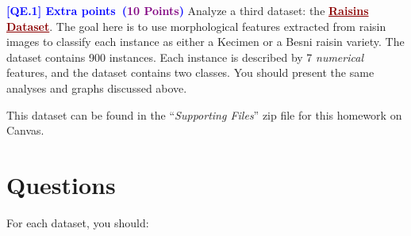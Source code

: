 \documentclass{article}
\newcommand{\HIGHLIGHT}[1]{\textcolor{blue}{\textbf{#1}}}
\newcommand{\POINTS}[1]{\textcolor{purple}{\textbf{{#1}}}}
\begin{document}
    \noindent \textbf{\HIGHLIGHT{[QE.1] Extra points~(\POINTS{10 Points})}} Analyze a third dataset: the \textcolor{darkred}{\textbf{\ul{Raisins Dataset}}}. The goal here is to use morphological features extracted from raisin images to classify each instance as either a Kecimen or a Besni raisin variety. The dataset contains 900 instances. Each instance is described by 7 \textit{numerical} features, and the dataset contains two classes. You should present the same analyses and graphs discussed above.
    \begin{mybox}[boxgray] 
    This dataset can be found in the ``\textit{Supporting Files}'' zip file for this homework on Canvas.
    \end{mybox}


\section*{Questions}

For each dataset, you should:
\end{document}
